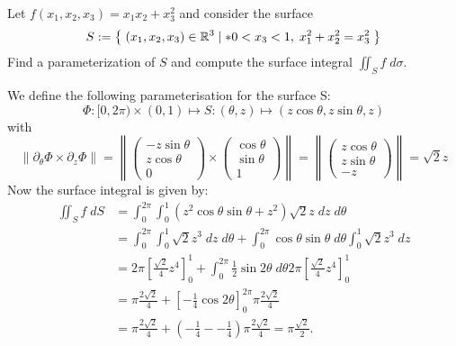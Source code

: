 \documentclass[11pt]{article}
\begin{document}
\begin{exercise}
    Let $f(x_{1},x_{2},x_3) = x_{1} x_{2} + x_3^2$ and consider the surface 
    \begin{gather*}
        S := \left\{ \; (x_{1},x_{2},x_3) \in \mathbb R^3 \suchthat* 0 < x_3 < 1, \; x_{1}^2 + x_{2}^2 = x_3^2 \;  \right\}
    \end{gather*}
    Find a parameterization of $S$ and compute the surface integral $\iint_S f \;d\sigma$. 
\end{exercise}
\begin{solution}
    We define the following parameterisation for the surface S:
    \[
    \Phi: [0,2\pi) \times (0,1) \mapsto S: (\theta,z)\mapsto (z\cos\theta, z\sin\theta,z)
    \]
    with
    \[
        \left\|\partial_{\theta}\Phi\times \partial_z\Phi\right\|  
        = 
        \left\|\begin{pmatrix} -z\sin\theta \\ z\cos\theta\\0 \end{pmatrix} \times \begin{pmatrix} \cos\theta \\ \sin\theta \\1 \end{pmatrix}\right\|
        = 
        \left\|\begin{pmatrix} z\cos\theta \\ z\sin\theta \\ -z \end{pmatrix}\right\| 
        = 
        \sqrt{2}z
    \]
    Now the surface integral is given by:
    \begin{align*}
        \iint_{S} f \;d S
        &
        = \int_0^{2\pi} \int_0^1 \left(z^2\cos\theta \sin\theta + z^2 \right)\sqrt{2}z\;d z \;d \theta
        \\&
        = \int_0^{2\pi} \int_0^1\sqrt{2}z^{3} \;d z \;d \theta + \int_0^{2\pi} \cos\theta \sin\theta \;d \theta \int_0^1  \sqrt{2}z^{3}\;d z 
        \\&
        =
        2\pi \left[\frac{\sqrt{2}}{4} z^{4}\right]_0^{1} + \int_0^{2\pi} \frac{1}{2}\sin2\theta \;d \theta 2\pi \left[\frac{\sqrt{2}}{4} z^{4}\right]_0^{1}
        \\&
        =
        \pi \frac{2\sqrt{2}}{4}+ \left[-\frac{1}{4}\cos2\theta\right]_{0}^{2\pi} \pi \frac{2\sqrt{2}}{4} 
        \\&
        = 
        \pi \frac{2\sqrt{2}}{4}+ \left(-\frac{1}{4} -  - \frac{1}{4}\right) \pi\frac{2\sqrt{2}}{4}
        = 
        \pi\frac{\sqrt{2}}{2}
        .
    \end{align*}
\end{solution}
\end{document}
